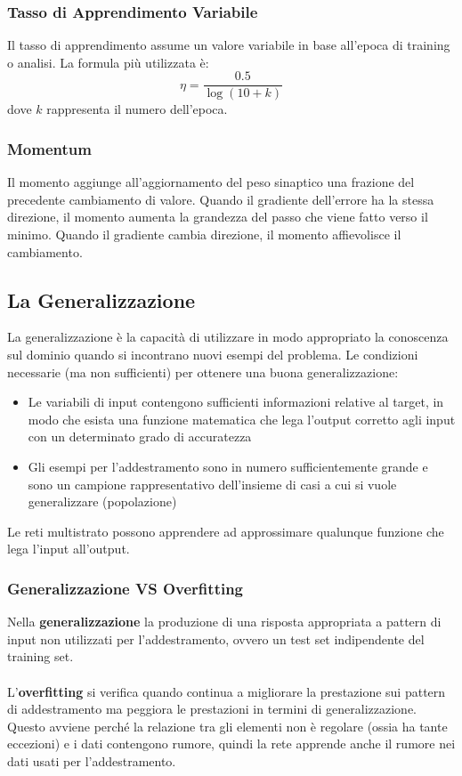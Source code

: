\subsubsection{Tasso di Apprendimento Variabile}
Il tasso di apprendimento assume un valore variabile in base all'epoca di training o analisi. La formula più utilizzata è: \[\eta = \frac{0.5}{\log{(10+k)}}\] dove \(k\) rappresenta il numero dell'epoca.

\subsubsection{Momentum}
Il momento aggiunge all'aggiornamento del peso sinaptico una frazione del precedente cambiamento di valore. Quando il gradiente dell'errore ha la stessa direzione, il momento aumenta la grandezza del passo che viene fatto verso il minimo. Quando il gradiente cambia direzione, il momento affievolisce il cambiamento.

\subsection{La Generalizzazione}
La generalizzazione è la capacità  di utilizzare in modo appropriato la conoscenza sul dominio quando si incontrano nuovi esempi del problema. Le condizioni necessarie (ma non sufficienti) per ottenere una buona generalizzazione:
\begin{itemize}
    \item Le variabili di input contengono sufficienti informazioni relative al target, in modo che esista una funzione matematica che lega l'output corretto agli input con un determinato grado di accuratezza
    \item Gli esempi per l'addestramento sono in numero sufficientemente grande e sono un campione rappresentativo dell'insieme di casi a cui si vuole generalizzare (popolazione)
\end{itemize}

Le reti multistrato possono apprendere ad approssimare qualunque funzione che lega l'input all'output.\\

\subsubsection{Generalizzazione VS Overfitting}
Nella \textbf{generalizzazione} la produzione di una risposta appropriata a pattern di input non utilizzati per l'addestramento, ovvero un test set indipendente del training set.
\\\\
L'\textbf{overfitting} si verifica quando continua a migliorare la prestazione sui pattern di addestramento ma peggiora le prestazioni in termini di generalizzazione.\\
Questo avviene perché la relazione tra gli elementi non è regolare (ossia ha tante eccezioni) e i dati contengono rumore, quindi la rete apprende anche il rumore nei dati usati per l'addestramento.

